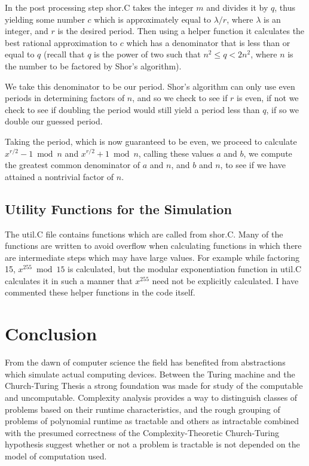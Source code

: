 \documentclass[]{article}
\begin{document}
In the post processing step shor.C takes the integer $m$ and divides
it by $q$, thus yielding some number $c$ which is approximately equal
to $\lambda / r$, where $\lambda$ is an integer, and $r$ is the
desired period. Then using a helper function it calculates the best
rational approximation to $c$ which has a denominator that is less
than or equal to $q$ (recall that $q$ is the power of two such that
$n^{2} \leq q < 2n^{2}$, where $n$ is the number to be factored by
Shor's algorithm).

We take this denominator to be our period.  Shor's algorithm can only
use even periods in determining factors of $n$, and so we check to see
if $r$ is even, if not we check to see if doubling the period would
still yield a period less than $q$, if so we double our guessed
period.

Taking the period, which is now guaranteed to be even, we proceed to
calculate $x^{r/2} - 1 \bmod n$ and $x^{r/2} + 1 \bmod n$, calling
these values $a$ and $b$, we compute the greatest common denominator
of $a$ and $n$, and $b$ and $n$, to see if we have attained a
nontrivial factor of $n$.

\subsection{Utility Functions for the Simulation}

The util.C file contains functions which are called from
shor.C. Many of the functions are written to avoid overflow when
calculating functions in which there are intermediate steps which may
have large values. For example while factoring 15, $x^{255} \bmod 15$
is calculated, but the modular exponentiation function in util.C
calculates it in such a manner that $x^{255}$ need not be explicitly
calculated. I have commented these helper functions in the code
itself.

\section{Conclusion}

From the dawn of computer science the field has benefited from
abstractions which simulate actual computing devices.  Between the
Turing machine and the Church-Turing Thesis a strong foundation was
made for study of the computable and uncomputable.  Complexity
analysis provides a way to distinguish classes of problems based on
their runtime characteristics, and the rough grouping of problems of
polynomial runtime as tractable and others as intractable combined
with the presumed correctness of the Complexity-Theoretic
Church-Turing hypothesis suggest whether or not a problem is tractable
is not depended on the model of computation used.
\end{document}
